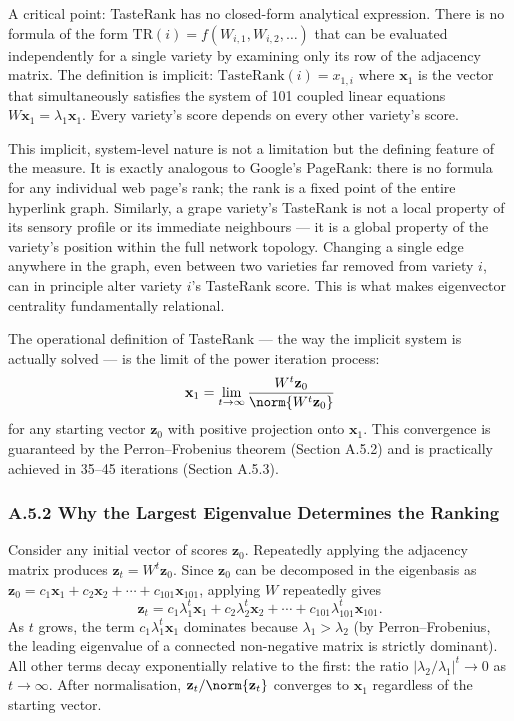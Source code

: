 \documentclass[11pt]{article}
\begin{document}
A critical point: TasteRank has no closed-form analytical expression. There is no formula of the form $\mathrm{TR}(i) = f(W_{i,1}, W_{i,2}, \ldots)$ that can be evaluated independently for a single variety by examining only its row of the adjacency matrix. The definition is implicit: $\mathrm{TasteRank}(i) = x_{1,i}$ where $\mathbf{x}_1$ is the vector that simultaneously satisfies the system of 101 coupled linear equations $W \mathbf{x}_1 = \lambda_1 \mathbf{x}_1$. Every variety's score depends on every other variety's score.

This implicit, system-level nature is not a limitation but the defining feature of the measure. It is exactly analogous to Google's PageRank: there is no formula for any individual web page's rank; the rank is a fixed point of the entire hyperlink graph. Similarly, a grape variety's TasteRank is not a local property of its sensory profile or its immediate neighbours --- it is a global property of the variety's position within the full network topology. Changing a single edge anywhere in the graph, even between two varieties far removed from variety $i$, can in principle alter variety $i$'s TasteRank score. This is what makes eigenvector centrality fundamentally relational.

The operational definition of TasteRank --- the way the implicit system is actually solved --- is the limit of the power iteration process:
\[
\mathbf{x}_1 = \lim_{t \to \infty} \frac{W^t \mathbf{z}_0}{\norm{W^t \mathbf{z}_0}}
\]
for any starting vector $\mathbf{z}_0$ with positive projection onto $\mathbf{x}_1$. This convergence is guaranteed by the Perron--Frobenius theorem (Section A.5.2) and is practically achieved in 35--45 iterations (Section A.5.3).

\subsubsection*{A.5.2 Why the Largest Eigenvalue Determines the Ranking}
Consider any initial vector of scores $\mathbf{z}_0$. Repeatedly applying the adjacency matrix produces $\mathbf{z}_t = W^t \mathbf{z}_0$. Since $\mathbf{z}_0$ can be decomposed in the eigenbasis as $\mathbf{z}_0 = c_1 \mathbf{x}_1 + c_2 \mathbf{x}_2 + \cdots + c_{101} \mathbf{x}_{101}$, applying $W$ repeatedly gives
\[
\mathbf{z}_t = c_1 \lambda_1^t \mathbf{x}_1 + c_2 \lambda_2^t \mathbf{x}_2 + \cdots + c_{101} \lambda_{101}^t \mathbf{x}_{101}.
\]
As $t$ grows, the term $c_1 \lambda_1^t \mathbf{x}_1$ dominates because $\lambda_1 > \lambda_2$ (by Perron--Frobenius, the leading eigenvalue of a connected non-negative matrix is strictly dominant). All other terms decay exponentially relative to the first: the ratio $|\lambda_2 / \lambda_1|^t \to 0$ as $t \to \infty$. After normalisation, $\mathbf{z}_t / \norm{\mathbf{z}_t}$ converges to $\mathbf{x}_1$ regardless of the starting vector.
\end{document}
